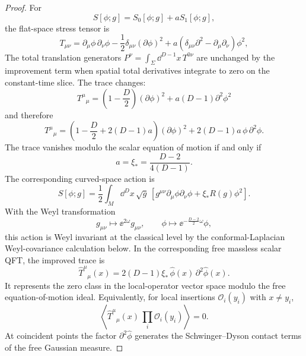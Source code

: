 \begin{proof}
For
\[
  S[\phi;g]=S_0[\phi;g]+aS_1[\phi;g],
\]
the flat-space stress tensor is
\begin{equation}
  T_{\mu\nu}
  =
  \partial_\mu\phi\,\partial_\nu\phi
  -
  \frac12\delta_{\mu\nu}(\partial\phi)^2
  +
  a
  \left(
  \delta_{\mu\nu}\partial^2-\partial_\mu\partial_\nu
  \right)\phi^2,
  \label{eq:improved-free-scalar-stress}
\end{equation}
The total translation generators
\(P^\nu=\int_\Sigma\dd^{D-1}x\,T^{0\nu}\) are unchanged by the improvement
term when spatial total derivatives integrate to zero on the constant-time
slice.  The trace changes:
\[
  T^\mu{}_\mu
  =
  \left(1-\frac D2\right)(\partial\phi)^2
  +
  a(D-1)\partial^2\phi^2
\]
and therefore
\[
  T^\mu{}_\mu
  =
  \left(1-\frac D2+2(D-1)a\right)(\partial\phi)^2
  +
  2(D-1)a\,\phi\,\partial^2\phi .
\]
The trace vanishes modulo the scalar equation of motion if and only if
\begin{equation}
  a=\xi_\ast=\frac{D-2}{4(D-1)}.
  \label{eq:conformal-scalar-xi}
\end{equation}
The corresponding curved-space action is
\begin{equation}
  S[\phi;g]
  =
  \frac12
  \int_M\dd^D x\,\sqrt g\,
  \left[
  g^{\mu\nu}\partial_\mu\phi\partial_\nu\phi
  +
  \xi_\ast R(g)\phi^2
  \right].
  \label{eq:conformal-scalar-curved-action}
\end{equation}
With the Weyl transformation
\[
  g_{\mu\nu}\mapsto \ee^{2\omega}g_{\mu\nu},
  \qquad
  \phi\mapsto \ee^{-\frac{D-2}{2}\omega}\phi,
\]
this action is Weyl invariant at the classical level by the conformal-Laplacian
Weyl-covariance calculation below.  In the
corresponding free massless scalar QFT, the improved trace is
\[
  \widehat T^\mu{}_\mu(x)
  =
  2(D-1)\xi_\ast\,\widehat\phi(x)\,\partial^2\widehat\phi(x).
\]
It represents the zero class in the local-operator vector space modulo the
free equation-of-motion ideal.  Equivalently, for local insertions
\(\mathcal O_i(y_i)\) with \(x\ne y_i\),
\[
  \left\langle
    \widehat T^\mu{}_\mu(x)\,
    \prod_i\mathcal O_i(y_i)
  \right\rangle
  =
  0 .
\]
At coincident points the factor \(\partial^2\widehat\phi\) generates the
Schwinger--Dyson contact terms of the free Gaussian measure.
\end{proof}

